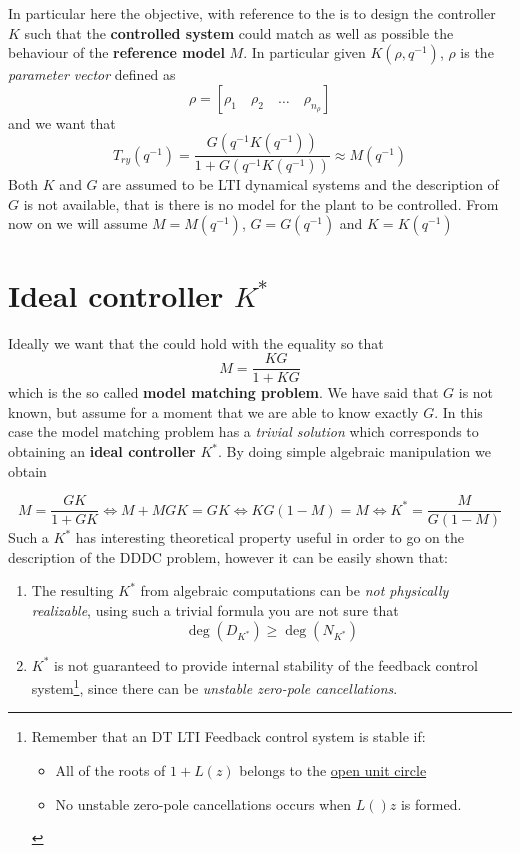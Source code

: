 In particular here the objective, with reference to the  is to design the controller $K$ such that the \textbf{controlled system} could match as well as possible the behaviour of the \textbf{reference model} $M$. In particular given $K(\rho, q^{-1})$, $\rho$ is the \textit{parameter vector} defined as
\begin{equation}
    \rho=[\rho_1 \quad \rho_2 \quad \dots \quad \rho_{n_\rho}]
\end{equation}
\noindent
and we want that 
\begin{equation}\label{eq:approxim}
    T_{ry}(q^{-1})=\frac{G(q^{-1} K(q^{-1}))}{1+G(q^{-1} K(q^{-1}))} \approx 
M(q^{-1})
\end{equation}
Both $K$ and $G$ are assumed to be LTI dynamical systems and the description of $G$ is not available, that is there is no model for the plant to  be controlled. From now on we will assume $M=M(q^{-1})$, $G=G(q^{-1})$ and $K=K(q^{-1})$

\section{Ideal controller $K^*$}
Ideally we want that the  could hold with the equality so that
\begin{equation}\label{eq:MMP}
    M=\frac{KG}{1+KG}
\end{equation}
which is the so called \textbf{model matching problem}. We have said that $G$ is not known, but assume for a moment that we are able to know exactly $G$. In this case the model matching problem has a \textit{trivial solution} which corresponds to obtaining an \textbf{ideal controller} $K^*$. By doing simple algebraic manipulation we obtain

\begin{equation}
    M=\frac{GK}{1+GK} \iff M+MGK=GK \iff KG(1-M)=M \iff K^*=\frac{M}{G(1-M)}
\end{equation}
Such a $K^*$ has interesting theoretical property useful in order to go on the description of the DDDC problem, however it can be easily shown that: 
\begin{enumerate}
    \itemsep-0.2em
    \item The resulting $K^*$ from algebraic computations can be \textit{not physically realizable}, using such a trivial formula you are not sure that
    \begin{equation*}
        \deg(D_{K^*}) \ge \deg(N_{K^*}) 
    \end{equation*}
    \item $K^*$ is not guaranteed to provide internal stability of the feedback control system\footnote{
        Remember that an DT LTI Feedback control system is stable if: 
        \begin{itemize}
            \itemsep-0.2em
            \item All of the roots of $1+L(z)$ belongs to the \underline{open unit circle}
            \item No unstable zero-pole cancellations occurs when $L()z$ is formed.
        \end{itemize}
    }, since there can be \textit{unstable zero-pole cancellations}.
\end{enumerate}

